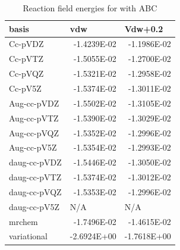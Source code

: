 \documentclass[../master_thesis.tex]{subfiles}
\begin{document}
\begin{table}[htbp]
\caption{Reaction field  energies for  with \ac{ABC}}
\begin{tabular}{|l|r|r|}
\hline
basis & \multicolumn{1}{l|}{vdw} & \multicolumn{1}{l|}{Vdw+0.2} \\ \hline
Cc-pVDZ & -1.4239E-02 & -1.1986E-02 \\ \hline
Cc-pVTZ & -1.5055E-02 & -1.2700E-02 \\ \hline
Cc-pVQZ & -1.5321E-02 & -1.2958E-02 \\ \hline
Cc-pV5Z & -1.5374E-02 & -1.3011E-02 \\ \hline
Aug-cc-pVDZ & -1.5502E-02 & -1.3105E-02 \\ \hline
Aug-cc-pVTZ & -1.5390E-02 & -1.3029E-02 \\ \hline
Aug-cc-pVQZ & -1.5352E-02 & -1.2996E-02 \\ \hline
Aug-cc-pV5Z & -1.5354E-02 & -1.2993E-02 \\ \hline
daug-cc-pVDZ & -1.5446E-02 & -1.3050E-02 \\ \hline
daug-cc-pVTZ & -1.5374E-02 & -1.3012E-02 \\ \hline
daug-cc-pVQZ & -1.5353E-02 & -1.2996E-02 \\ \hline
daug-cc-pV5Z & \multicolumn{1}{l|}{N/A} & \multicolumn{1}{l|}{N/A} \\ \hline
mrchem & -1.7496E-02 & -1.4615E-02 \\ \hline
variational & -2.6924E+00 & -1.7618E+00 \\ \hline
\end{tabular}
\label{tab:abcEracetamid}
\end{table}



\biblio
\end{document}
